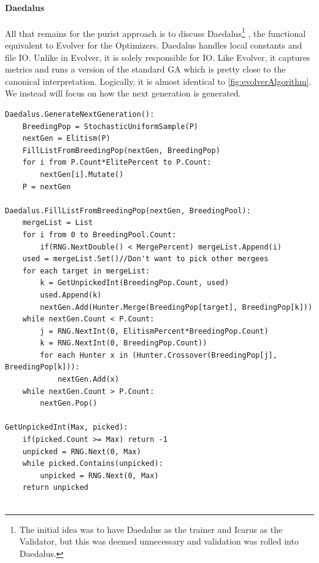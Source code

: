 \paragraph{Daedalus}
All that remains for the purist approach is to discuss Daedalus\footnote{The initial idea was to have Daedalus as the trainer and Icarus as the Validator, but this was deemed unnecessary and validation was rolled into Daedalus.}  , the functional equivalent to Evolver for the Optimizers.  Daedalus handles local constants and file IO.  Unlike in Evolver, it is solely responsible for IO.  Like Evolver, it captures metrics and runs a version of the standard GA which is pretty close to the canonical interpretation.  Logically, it is almost identical to \ref{fig:evolverAlgorithm}. We instead will focus on how the next generation is generated.
\begin{lstlisting}[language=algorithm, caption={Daedalus Generate Next Generation}, label={fig:daedalusga}]
Daedalus.GenerateNextGeneration():
	BreedingPop = StochasticUniformSample(P)
	nextGen = Elitism(P)
	FillListFromBreedingPop(nextGen, BreedingPop)
	for i from P.Count*ElitePercent to P.Count:
		nextGen[i].Mutate()
	P = nextGen

Daedalus.FillListFromBreedingPop(nextGen, BreedingPool):
	mergeList = List
	for i from 0 to BreedingPool.Count:
		if(RNG.NextDouble() < MergePercent) mergeList.Append(i)
	used = mergeList.Set()//Don't want to pick other mergees
	for each target in mergeList:
		k = GetUnpickedInt(BreedingPop.Count, used)
		used.Append(k)
		nextGen.Add(Hunter.Merge(BreedingPop[target], BreedingPop[k]))
	while nextGen.Count < P.Count:
		j = RNG.NextInt(0, ElitismPercent*BreedingPop.Count)
		k = RNG.NextInt(0, BreedingPop.Count))
		for each Hunter x in (Hunter.Crossover(BreedingPop[j], BreedingPop[k])):
			nextGen.Add(x)
	while nextGen.Count > P.Count:
		nextGen.Pop()
	
GetUnpickedInt(Max, picked):
	if(picked.Count >= Max) return -1
	unpicked = RNG.Next(0, Max)
	while picked.Contains(unpicked):
		unpicked = RNG.Next(0, Max)
	return unpicked
		
\end{lstlisting}

